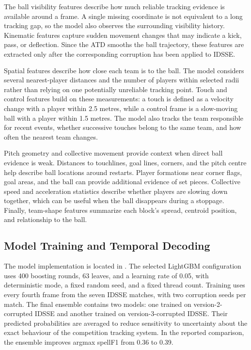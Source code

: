 \documentclass[11pt,a4paper]{article}
\begin{document}
The ball visibility features describe how much reliable tracking evidence is available around a frame. A single missing coordinate is not equivalent to a long tracking gap, so the model also observes the surrounding visibility history. Kinematic features capture sudden movement changes that may indicate a kick, pass, or deflection. Since the ATD smooths the ball trajectory, these features are extracted only after the corresponding corruption has been applied to IDSSE.

Spatial features describe how close each team is to the ball. The model considers several nearest-player distances and the number of players within selected radii rather than relying on one potentially unreliable tracking point. Touch and control features build on these measurements: a touch is defined as a velocity change with a player within 2.5 metres, while a control frame is a slow-moving ball with a player within 1.5 metres. The model also tracks the team responsible for recent events, whether successive touches belong to the same team, and how often the nearest team changes.

Pitch geometry and collective movement provide context when direct ball evidence is weak. Distances to touchlines, goal lines, corners, and the pitch centre help describe ball locations around restarts. Player formations near corner flags, goal areas, and the ball can provide additional evidence of set pieces. Collective speed and acceleration statistics describe whether players are slowing down together, which can be useful when the ball disappears during a stoppage. Finally, team-shape features summarize each block's spread, centroid position, and relationship to the ball.

\subsection{Model Training and Temporal Decoding}

The model implementation is located in . The selected LightGBM configuration uses 400 boosting rounds, 63 leaves, and a learning rate of 0.05, with deterministic mode, a fixed random seed, and a fixed thread count. Training uses every fourth frame from the seven IDSSE matches, with two corruption seeds per match. The final ensemble contains two models: one trained on version-2-corrupted IDSSE and another trained on version-3-corrupted IDSSE. Their predicted probabilities are averaged to reduce sensitivity to uncertainty about the exact behaviour of the competition tracking system. In the reported comparison, the ensemble improves argmax spellF1 from 0.36 to 0.39.
\end{document}
